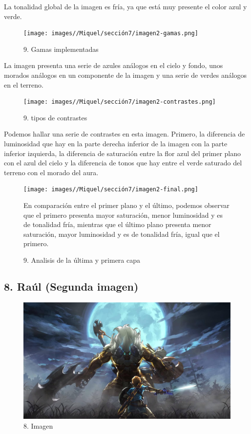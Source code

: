 \documentclass[12pt]{article}
\begin{document}
     La tonalidad global de la imagen es fría, ya que está muy presente el color azul y verde.   

\begin{figure}[H]
      \centering
      \texttt{[image: images//Miquel/sección7/imagen2-gamas.png]}
      \caption{\small 9. Gamas implementadas}
    \end{figure}
  
    La imagen presenta una serie de azules análogos en el cielo y fondo, unos morados análogos en un componente de la imagen y una serie de verdes análogos en el terreno.

\begin{figure}[H]
      \centering
      \texttt{[image: images//Miquel/sección7/imagen2-contrastes.png]}
      \caption{\small 9. tipos de contrastes}
    \end{figure}
    
    Podemos hallar una serie de contrastes en esta imagen. Primero, la diferencia de luminosidad que hay en la parte derecha inferior de la imagen con la parte inferior izquierda, la diferencia de saturación entre la flor azul del primer plano con el azul del cielo  y la diferencia de tonos que hay entre el verde saturado del terreno con el morado del aura.

    \begin{figure}[H]
      \centering
      \texttt{[image: images//Miquel/sección7/imagen2-final.png]}
      \caption{\small 9. Analisis de la última y primera capa}

    En comparación entre el primer plano y el último, podemos observar que el primero presenta mayor saturación, menor luminosidad y es de tonalidad fría, mientras que el último plano presenta menor saturación, mayor luminosidad y es de tonalidad fría, igual que el primero.


    \end{figure}

    \subsection{8. Raúl (Segunda imagen)}
    \begin{figure}[H]
      \centering
      \includegraphics[scale=0.25]{images/Concepts/8_concept_art}
      \caption{\small 8. Imagen}
    \end{figure}
\end{document}
